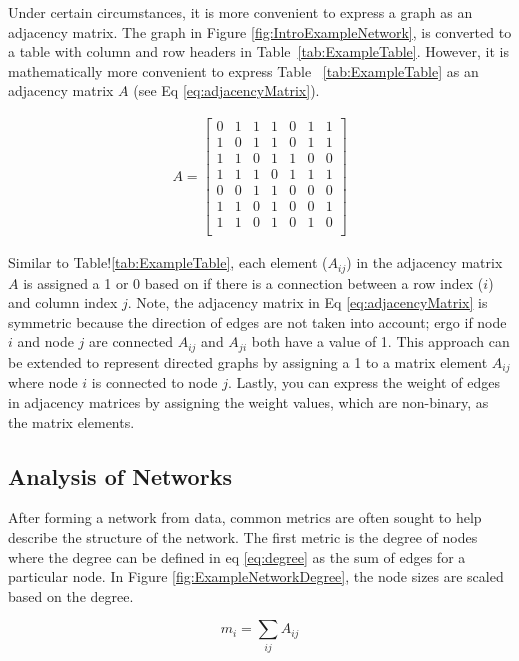 Under certain circumstances, it is more convenient to express a graph as an adjacency matrix.  The graph in Figure \ref{fig:IntroExampleNetwork}, is converted to a table with column and row headers  in Table~\ref{tab:ExampleTable}. However, it is mathematically more convenient to express Table~ \ref{tab:ExampleTable} as an adjacency matrix $A$ (see Eq \ref{eq:adjacencyMatrix}).

\begin{gather}
A =
 \begin{bmatrix}
    0 & 1 & 1 & 1 & 0 & 1 & 1 \\
    1 & 0 & 1 & 1 & 0 & 1 & 1 \\
    1 & 1 & 0 & 1 & 1 & 0 & 0 \\
    1 & 1 & 1 & 0 & 1 & 1 & 1 \\
    0 & 0 & 1 & 1 & 0 & 0 & 0 \\ 
    1 & 1 & 0 & 1 & 0 & 0 & 1 \\
    1 & 1 & 0 & 1 & 0 & 1 & 0 \\
  \end{bmatrix}
  \label{eq:adjacencyMatrix}
\end{gather}

\noindent Similar to Table!\ref{tab:ExampleTable}, each element (\(A_{ij}\)) in the adjacency matrix \(A\) is assigned a 1 or 0 based on if there is a connection between a row index (\(i\))  and column index \(j\). Note, the adjacency matrix in Eq \ref{eq:adjacencyMatrix} is symmetric because 
the direction of edges are not taken into account; ergo if node \(i\) and node \(j\) are connected \(A_{ij}\) and \(A_{ji}\) both have a value of 1. This approach can be extended to represent directed graphs by assigning a 1 to a matrix element \(A_{ij}\) where node \(i\) is connected to node \(j\). Lastly, you can express the weight of edges in adjacency matrices by assigning the weight values, which are non-binary, as the matrix elements.

\subsection{Analysis of Networks}
After forming a network from data, common metrics are often sought to help describe the structure of the network.  The first metric is the degree of nodes where the degree  can be defined in eq \ref{eq:degree} as the sum of edges for a particular node. In Figure \ref{fig:ExampleNetworkDegree}, the node sizes are scaled based on the degree.

\begin{equation}
    \label{eq:degree}
    m_i =  \sum_{ij}A_{ij}
\end{equation}

